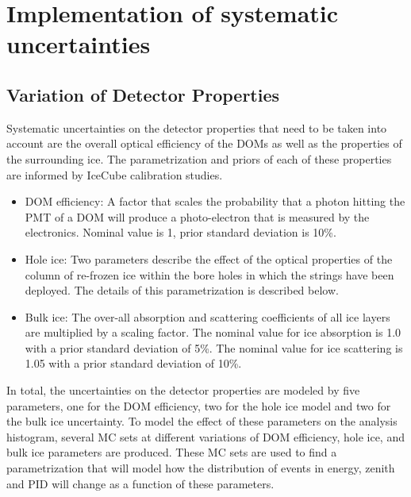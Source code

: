 \section{Implementation of systematic uncertainties}
\subsection{Variation of Detector Properties}
\label{sec:detector-unc}
Systematic uncertainties on the detector properties that need to be taken into account are the overall optical efficiency of the DOMs as well as the properties of the surrounding ice.
The parametrization and priors of each of these properties are informed by IceCube calibration studies.
\begin{itemize}
    \item DOM efficiency: A factor that scales the probability that a photon hitting the PMT of a DOM will produce a photo-electron that is measured by the electronics.
Nominal value is 1, prior standard deviation is 10\%.
    \item Hole ice: Two parameters describe the effect of the optical properties of the column of re-frozen ice within the bore holes in which the strings have been deployed.
The details of this parametrization is described below.
    \item Bulk ice: The over-all absorption and scattering coefficients of all ice layers are multiplied by a scaling factor.
The nominal value for ice absorption is 1.0 with a prior standard deviation of 5\%.
The nominal value for ice scattering is 1.05 with a prior standard deviation of 10\%.
\end{itemize}

In total, the uncertainties on the detector properties are modeled by five  parameters, one for the DOM efficiency, two for the hole ice model and two for the bulk ice uncertainty.
To model the effect of these parameters on the analysis histogram, several MC sets at different variations of DOM efficiency, hole ice, and bulk ice parameters are produced.
These MC sets are used to find a parametrization that will model how the distribution of events in energy, zenith and PID will change as a function of these parameters.

